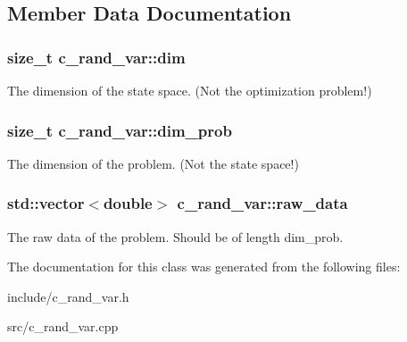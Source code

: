 \subsection{\-Member \-Data \-Documentation}
\hypertarget{classc__rand__var_a6bdf916d8aa06727128106e54bc36813}{
\subsubsection[{dim}]{\setlength{\rightskip}{0pt plus 5cm}size\-\_\-t {\bf c\-\_\-rand\-\_\-var\-::dim}}}\label{classc__rand__var_a6bdf916d8aa06727128106e54bc36813}
\-The dimension of the state space. (\-Not the optimization problem!) \hypertarget{classc__rand__var_af0c3924c20a6118bbe142637f735bd32}{
\subsubsection[{dim\-\_\-prob}]{\setlength{\rightskip}{0pt plus 5cm}size\-\_\-t {\bf c\-\_\-rand\-\_\-var\-::dim\-\_\-prob}}}\label{classc__rand__var_af0c3924c20a6118bbe142637f735bd32}
\-The dimension of the problem. (\-Not the state space!) \hypertarget{classc__rand__var_a259d5bac81373870d51a9cbac2e4aa5b}{
\subsubsection[{raw\-\_\-data}]{\setlength{\rightskip}{0pt plus 5cm}std\-::vector$<$double$>$ {\bf c\-\_\-rand\-\_\-var\-::raw\-\_\-data}}}\label{classc__rand__var_a259d5bac81373870d51a9cbac2e4aa5b}
\-The raw data of the problem. \-Should be of length dim\-\_\-prob. 

\-The documentation for this class was generated from the following files\-:\begin{DoxyCompactItemize}
\item 
include/c\-\_\-rand\-\_\-var.\-h\item 
src/c\-\_\-rand\-\_\-var.\-cpp\end{DoxyCompactItemize}
